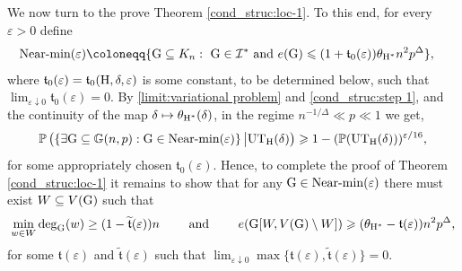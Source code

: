 \documentclass[a4paper,11pt,english,reqno]{amsart}
\numberwithin{equation}{section}
\renewcommand{\leq}{\leqslant}
\renewcommand{\geq}{\geqslant}
\newcommand{\UTH}{\textup{UT}_{\textup{H}}(\delta)}
\newcommand{\uH}{\textup{H}}
\renewcommand{\P}{\mathbb{P}}
\newcommand{\G}{\mathbb{G}}
\newcommand{\tu}[1]{\textup{#1}}
\newcommand{\purple}[1]{{\color{purple} #1}}
\begin{document}
			We now turn to the prove Theorem \ref{cond_struc:loc-1}. To this end, for every $\varepsilon>0$ define
			\begin{equation*}
				\begin{aligned}
					\tu{Near-min}(\varepsilon) \coloneqq &\{\tu{G}\subseteq K_{n}:\ \tu{G} \in \mathcal{I}^* \text{ and } e(\tu{G})\leq (1+\mathfrak{t}_0 (\varepsilon))\theta_{\uH^{*}} n^{2}p^{\Delta} \},
				\end{aligned}
			\end{equation*}
			where $\mathfrak{t}_0(\varepsilon) = \mathfrak{t}_0(\uH, \delta, \varepsilon)$ is some constant, to be determined below, such that $\lim_{\varepsilon \downarrow 0} \mathfrak{t}_0(\varepsilon) =0$. By \eqref{limit:variational problem} and \eqref{cond_struc:step 1}, and the continuity of the map $\delta \mapsto \theta_{\uH^*}(\delta)$, in the regime $n^{-1/\Delta}\ll p\ll 1$ we get, 
			\begin{equation*}
				\P\left(\left\{\exists \tu{G}\subseteq  \G(n,p): \tu{G}\in\tu{Near-min}(\varepsilon)\right\}\big| \UTH\right)\geq 1-(\P(\UTH))^{\varepsilon/16},
			\end{equation*}
			for some appropriately chosen $\mathfrak{t}_0(\varepsilon)$. Hence, to complete the proof of Theorem \ref{cond_struc:loc-1} it remains to show that for any $\tu{G} \in \tu{Near-min}(\varepsilon)$ there must exist $W \subseteq V(\tu{G})$ such that
			\begin{equation}\label{eq:W-bd}
				\min_{w \in W} \deg_{\tu{G}}(w) \ge (1-\widetilde{\mathfrak{t}}(\varepsilon))n \qquad \text{ and } \qquad e(\tu{G}[W, V(\tu{G})\setminus W]) \geq (\theta_{\uH^*} - \mathfrak{t}(\varepsilon))n^2 p^\Delta,
			\end{equation}
			for some $\mathfrak{t}(\varepsilon)$ and $\widetilde{\mathfrak{t}}(\varepsilon)$ such that $\lim_{\varepsilon \downarrow 0} \max\{\mathfrak{t}(\varepsilon), \widetilde{\mathfrak{t}}(\varepsilon)\} =0$.
			
%			
%
			
\end{document}
